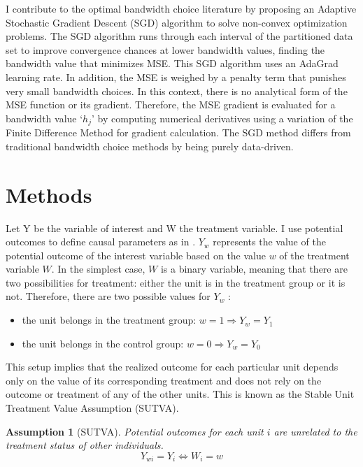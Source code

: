 \documentclass[12pt]{article}
\theoremstyle{plain}
\newtheorem{assumption}{Assumption}
\theoremstyle{remark}
\begin{document}
I contribute to the optimal bandwidth choice literature by proposing an Adaptive Stochastic Gradient Descent (SGD) algorithm \parencite{robbins1951stochastic} to solve non-convex optimization problems. The SGD algorithm runs through each interval of the partitioned data set to improve convergence chances at lower bandwidth values, finding the bandwidth value that minimizes MSE. This SGD algorithm uses an AdaGrad learning rate. In addition, the MSE is weighed by a penalty term that punishes very small bandwidth choices. In this context, there is no analytical form of the MSE function or its gradient. Therefore, the MSE gradient is evaluated for a bandwidth value ‘$h_j$’ by computing numerical derivatives using a variation of the Finite Difference Method for gradient calculation. The SGD method differs from traditional bandwidth choice methods by being purely data-driven.

\newpage
\section{Methods}

Let Y be the variable of interest and W the treatment variable. I use potential outcomes to define causal parameters as in \textcite{Rubin1974}. $Y_w$ represents the value of the potential outcome of the interest variable based on the value $w$ of the treatment variable $W$. In the simplest case, $W$ is a binary variable, meaning that there are two possibilities for treatment: either the unit is in the treatment group or it is not. Therefore, there are two possible values for $Y_w$ : 
\begin{itemize}
    \item the unit belongs in the treatment group: $w=1 \Rightarrow Y_w = Y_1$
    \item the unit belongs in the control group: $w=0 \Rightarrow Y_w = Y_0$
\end{itemize}

This setup implies that the realized outcome for each particular unit depends only on the value of its corresponding treatment and does not rely on the outcome or treatment of any of the other units. This is known as the Stable Unit Treatment Value Assumption (SUTVA).

\begin{assumption}[SUTVA]
    Potential outcomes for each unit $i$ are unrelated to the treatment status of other individuals. 
    \[Y_{wi} = Y_i \Leftrightarrow W_{i}=w\]
\end{assumption}
\end{document}
